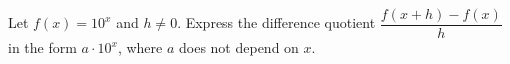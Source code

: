 Let $f(x)=10^x$ and $h\ne0$. Express the difference quotient $\dfrac{f(x+h)-f(x)}{h}$ in the form $a\cdot10^x$, where $a$ does not depend on $x$.
